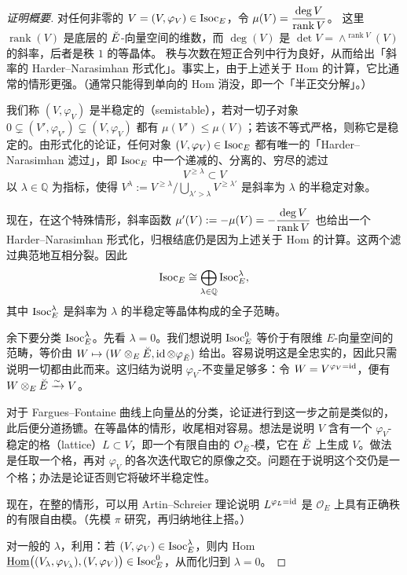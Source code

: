\begin{proof}[证明概要]
对任何非零的 $V=(V,\varphi_V)\in\operatorname{Isoc}_E$，令 $\mu(V)=\dfrac{\deg V}{\operatorname{rank} V}$。
这里 $\operatorname{rank}(V)$ 是底层的 $\breve{E}$-向量空间的维数，而 $\deg(V)$ 是 $\det V=\wedge^{\operatorname{rank}V}(V)$ 的斜率，后者是秩 $1$ 的等晶体。
秩与次数在短正合列中行为良好，从而给出「斜率的 Harder--Narasimhan 形式化」。事实上，由于上述关于 Hom 的计算，它比通常的情形更强。（通常只能得到单向的 Hom 消没，即一个「半正交分解」。）

我们称 $(V,\varphi_V)$ 是半稳定的（semistable），若对一切子对象 $0\subsetneq(V',\varphi_{V'})\subsetneq(V,\varphi_V)$ 都有 $\mu(V')\le\mu(V)$；若该不等式严格，则称它是稳定的。由形式化的论证，任何对象 $(V,\varphi_V)\in\operatorname{Isoc}_E$ 都有唯一的「Harder--Narasimhan 滤过」，即 $\operatorname{Isoc}_E$ 中一个递减的、分离的、穷尽的滤过
\[
V^{\ge\lambda}\subset V
\]
以 $\lambda\in\mathbb{Q}$ 为指标，使得 $V^{\lambda}:=V^{\ge\lambda}\big/\bigcup_{\lambda'>\lambda}V^{\ge\lambda'}$ 是斜率为 $\lambda$ 的半稳定对象。

现在，在这个特殊情形，斜率函数 $\mu'(V):=-\mu(V)=-\dfrac{\deg V}{\operatorname{rank} V}$ 也给出一个 Harder--Narasimhan 形式化，归根结底仍是因为上述关于 Hom 的计算。这两个滤过典范地互相分裂。因此
\[
\operatorname{Isoc}_E\cong\bigoplus_{\lambda\in\mathbb{Q}}\operatorname{Isoc}_E^\lambda,
\]
其中 $\operatorname{Isoc}_E^\lambda$ 是斜率为 $\lambda$ 的半稳定等晶体构成的全子范畴。

余下要分类 $\operatorname{Isoc}_E^\lambda$。先看 $\lambda=0$。我们想说明 $\operatorname{Isoc}_E^0$ 等价于有限维 $E$-向量空间的范畴，等价由 $W\mapsto(W\otimes_E\breve{E},\operatorname{id}\otimes\varphi_{\breve{E}})$ 给出。容易说明这是全忠实的，因此只需说明一切都由此而来。这归结为说明 $\varphi_V$-不变量足够多：令 $W=V^{\varphi_V=\operatorname{id}}$，便有 $W\otimes_E\breve{E}\xrightarrow{\sim}V$。

对于 Fargues--Fontaine 曲线上向量丛的分类，论证进行到这一步之前是类似的，此后便分道扬镳。在等晶体的情形，收尾相对容易。想法是说明 $V$ 含有一个 $\varphi_V$-稳定的格（lattice）$L\subset V$，即一个有限自由的 $\mathcal{O}_{\breve{E}}$-模，它在 $\breve{E}$ 上生成 $V$。做法是任取一个格，再对 $\varphi_V$ 的各次迭代取它的原像之交。问题在于说明这个交仍是一个格；办法是论证否则它将破坏半稳定性。

现在，在整的情形，可以用 Artin--Schreier 理论说明 $L^{\varphi_L=\operatorname{id}}$ 是 $\mathcal{O}_E$ 上具有正确秩的有限自由模。（先模 $\pi$ 研究，再归纳地往上搭。）

对一般的 $\lambda$，利用：若 $(V,\varphi_V)\in\operatorname{Isoc}_E^\lambda$，则内 Hom $\underline{\operatorname{Hom}}\bigl((V_\lambda,\varphi_{V_\lambda}),(V,\varphi_V)\bigr)\in\operatorname{Isoc}_E^0$，从而化归到 $\lambda=0$。
\end{proof}

